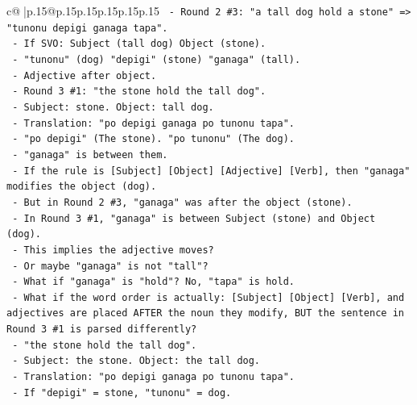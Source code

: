 \documentclass{article}
\begin{document}
{\begin{supertabular}{c@{$\;$}|p{.15\linewidth}@{}p{.15\linewidth}p{.15\linewidth}p{.15\linewidth}p{.15\linewidth}p{.15\linewidth}}
{{{\texttt{                    {-} Round 2 \#3: "a tall dog hold a stone" => "tunonu depigi ganaga tapa".} \\
\texttt{                      {-} If SVO: Subject (tall dog) Object (stone).} \\
\texttt{                      {-} "tunonu" (dog) "depigi" (stone) "ganaga" (tall).} \\
\texttt{                      {-} Adjective after object.} \\
\texttt{                    {-} Round 3 \#1: "the stone hold the tall dog".} \\
\texttt{                      {-} Subject: stone. Object: tall dog.} \\
\texttt{                      {-} Translation: "po depigi ganaga po tunonu tapa".} \\
\texttt{                      {-} "po depigi" (The stone). "po tunonu" (The dog).} \\
\texttt{                      {-} "ganaga" is between them.} \\
\texttt{                      {-} If the rule is {[}Subject{]} {[}Object{]} {[}Adjective{]} {[}Verb{]}, then "ganaga" modifies the object (dog).} \\
\texttt{                      {-} But in Round 2 \#3, "ganaga" was after the object (stone).} \\
\texttt{                      {-} In Round 3 \#1, "ganaga" is between Subject (stone) and Object (dog).} \\
\texttt{                      {-} This implies the adjective moves?} \\
\texttt{                      {-} Or maybe "ganaga" is not "tall"?} \\
\texttt{                      {-} What if "ganaga" is "hold"? No, "tapa" is hold.} \\
\texttt{                      {-} What if the word order is actually: {[}Subject{]} {[}Object{]} {[}Verb{]}, and adjectives are placed AFTER the noun they modify, BUT the sentence in Round 3 \#1 is parsed differently?} \\
\texttt{                      {-} "the stone hold the tall dog".} \\
\texttt{                      {-} Subject: the stone. Object: the tall dog.} \\
\texttt{                      {-} Translation: "po depigi ganaga po tunonu tapa".} \\
\texttt{                      {-} If "depigi" = stone, "tunonu" = dog.} \\
}}}
\end{supertabular}}
\end{document}

